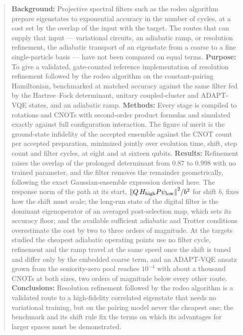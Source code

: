 \documentclass[
  aps,            %
  prc,            %
  reprint,        %
  superscriptaddress,
  floatfix,
  nofootinbib
]{revtex4-2}
\newcommand{\Hhigh}{H_{\mathrm{high}}}
\begin{document}
\begin{abstract}
\textbf{Background:} Projective spectral filters such as the rodeo
algorithm prepare eigenstates to exponential accuracy in the number of
cycles, at a cost set by the overlap of the input with the target.  The
routes that can supply that input --- variational circuits, an adiabatic
ramp, or resolution refinement, the adiabatic transport of an eigenstate
from a coarse to a fine single-particle basis --- have not been compared on
equal terms.
\textbf{Purpose:} To give a validated, gate-counted reference
implementation of resolution refinement followed by the rodeo algorithm on
the constant-pairing Hamiltonian, benchmarked at matched accuracy against
the same filter fed by the Hartree--Fock determinant, unitary
coupled-cluster and ADAPT-VQE states, and an adiabatic ramp.
\textbf{Methods:} Every stage is compiled to rotations and CNOTs with
second-order product formulas and simulated exactly against full
configuration interaction.  The figure of merit is the ground-state
infidelity of the accepted ensemble against the CNOT count per accepted
preparation, minimized jointly over evolution time, shift, step count and
filter cycles, at eight and at sixteen qubits.
\textbf{Results:} Refinement raises the overlap of the prolonged
determinant from $0.87$ to $0.998$ with no trained parameter, and the
filter removes the remainder geometrically, following the exact
Gaussian-ensemble expression derived here.  The response norm of the path
at its start, $\norm{Q\,\Hhigh P\psi_{\rm low}}^2/b^2$ for shift $b$, fixes
how the shift must scale; the long-run state of the digital filter is the
dominant eigenoperator of an averaged post-selection map, which sets its
accuracy floor; and the available sufficient adiabatic and Trotter
conditions overestimate the cost by two to three orders of magnitude.  At
the targets studied the cheapest adiabatic operating points use no filter
cycle, refinement and the ramp travel at the same speed once the shift is
tuned and differ only by the embedded coarse term, and an ADAPT-VQE ansatz
grown from the seniority-zero pool reaches $10^{-4}$ with about a thousand
CNOTs at both sizes, two orders of magnitude below every other route.
\textbf{Conclusions:} Resolution refinement followed by the rodeo algorithm
is a validated route to a high-fidelity correlated eigenstate that needs no
variational training, but on the pairing model never the cheapest one; the
benchmark and its shift rule fix the terms on which its advantages for
larger spaces must be demonstrated.
\end{abstract}
\end{document}
